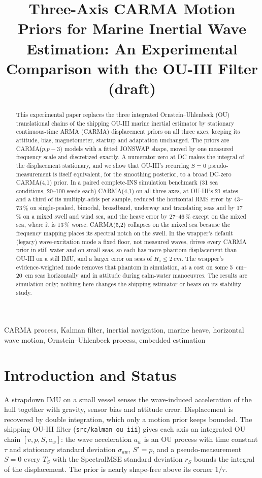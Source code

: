 \documentclass[conference]{IEEEtran}
\title{Three-Axis CARMA Motion Priors for Marine Inertial Wave Estimation:
An Experimental Comparison with the OU-III Filter (draft)}
\author{%
  \IEEEauthorblockN{Mikhail S. Grushinskiy}
  \IEEEauthorblockA{Independent Researcher, USA, Fair Lawn\\
  Bareboat Necessities GitHub Project\\
  Email: mgrouch@users.github.com}%
}
\theoremstyle{bodysmall}
\begin{document}
\maketitle

\begin{abstract}
This experimental paper replaces the three integrated Ornstein--Uhlenbeck
(OU) translational chains of the shipping OU-III marine inertial estimator by
stationary continuous-time ARMA (CARMA) displacement priors on all three
axes, keeping its attitude, bias, magnetometer, startup and adaptation
unchanged. The priors are CARMA($p$,$p-3$) models with a fitted JONSWAP shape,
moved by one measured frequency scale and discretized exactly. A numerator
zero at DC makes the integral of the displacement stationary, and we show
that OU-III's recurring $S=0$ pseudo-measurement is itself equivalent, for
the smoothing posterior, to a broad DC-zero CARMA(4,1) prior. In a paired
complete-INS simulation benchmark (31 sea conditions, 20--100 seeds each)
CARMA(4,1) on all three axes, at OU-III's 21 states and a third of its
multiply-adds per sample, reduced the horizontal RMS error by 43--73\,\% on
single-peaked, bimodal, broadband, underway and translating seas and by
17\,\% on a mixed swell and wind sea, and the heave error by 27--46\,\%
except on the mixed sea, where it is 13\,\% worse. CARMA(5,2) collapses on
the mixed sea because the frequency mapping places its spectral notch on the
swell. In the wrapper's default (legacy) wave-excitation mode a fixed floor,
not measured waves, drives every CARMA prior in still water and on small
seas, so each has more phantom displacement than OU-III on a still IMU, and
a larger error on seas of $H_s\le\SI{2}{cm}$. The wrapper's evidence-weighted mode removes
that phantom in simulation, at a cost on some \SIrange{5}{20}{cm} seas
horizontally and in attitude during calm-water manoeuvres. The results are
simulation only; nothing here changes the shipping estimator or bears on its
stability study.
\end{abstract}


\begin{IEEEkeywords}
CARMA process, Kalman filter, inertial navigation, marine heave, horizontal
wave motion, Ornstein--Uhlenbeck process, embedded estimation
\end{IEEEkeywords}

\section{Introduction and Status}
\label{sec:intro}
A strapdown IMU on a small vessel senses the wave-induced acceleration of the
hull together with gravity, sensor bias and attitude error. Displacement is
recovered by double integration, which only a motion prior keeps bounded. The
shipping OU-III filter (\texttt{src/kalman\_ou\_iii}) gives each axis an
integrated OU chain $[v,p,S,a_w]$: the wave acceleration $a_w$ is an OU
process with time constant $\tau$ and stationary standard deviation
$\sigma_{aw}$, $S'=p$, and a pseudo-measurement $S=0$ every $T_S$ with the
SpectralMSE standard deviation $r_S$ bounds the integral of the
displacement. The prior is nearly shape-free above its corner $1/\tau$.
\end{document}
